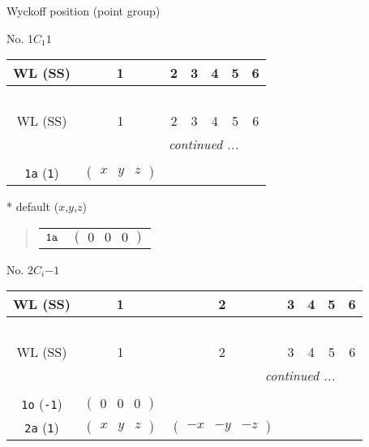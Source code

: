 \documentclass[fleqn,9pt,landscape]{jsarticle}
\begin{document}
\setcounter{MaxMatrixCols}{16}

\begin{center}
\LARGE
Wyckoff position (point group)
\end{center}
No. 1\quad$C_{1}$\quad$1$\quad[ triclinic ]
\begin{center}
\renewcommand{\arraystretch}{1.2}
\begin{longtable}{ccccccc}
 \hline \hline
WL (SS) & 1 & 2 & 3 & 4 & 5 & 6 \\ \hline \endfirsthead

\multicolumn{6}{l}{\tablename\ \thetable{}} \\
 \hline \hline
WL (SS) & 1 & 2 & 3 & 4 & 5 & 6 \\ \hline \endhead

 \hline \hline
\multicolumn{6}{r}{\footnotesize\it continued ...} \\ \endfoot

 \hline \hline
\multicolumn{6}{r}{} \\ \endlastfoot

{\tt 1a} ({\tt 1}) & $ \begin{pmatrix} x & y & z \end{pmatrix} $ \\
\end{longtable}
\end{center}
* default ($x$,$y$,$z$)
\begin{quote}
\begin{tabular}{cc}
$ {\tt 1a} $ & $ \begin{pmatrix} 0 & 0 & 0 \end{pmatrix} $
\end{tabular}
\end{quote}
\newpage
No. 2\quad$C_{i}$\quad$-1$\quad[ triclinic ]
\begin{center}
\renewcommand{\arraystretch}{1.2}
\begin{longtable}{ccccccc}
 \hline \hline
WL (SS) & 1 & 2 & 3 & 4 & 5 & 6 \\ \hline \endfirsthead

\multicolumn{6}{l}{\tablename\ \thetable{}} \\
 \hline \hline
WL (SS) & 1 & 2 & 3 & 4 & 5 & 6 \\ \hline \endhead

 \hline \hline
\multicolumn{6}{r}{\footnotesize\it continued ...} \\ \endfoot

 \hline \hline
\multicolumn{6}{r}{} \\ \endlastfoot

{\tt 1o} ({\tt -1}) & $ \begin{pmatrix} 0 & 0 & 0 \end{pmatrix} $ & $  $ \\ \hline
{\tt 2a} ({\tt 1}) & $ \begin{pmatrix} x & y & z \end{pmatrix} $ & $ \begin{pmatrix} - x & - y & - z \end{pmatrix} $ \\
\end{longtable}
\end{center}
\end{document}
